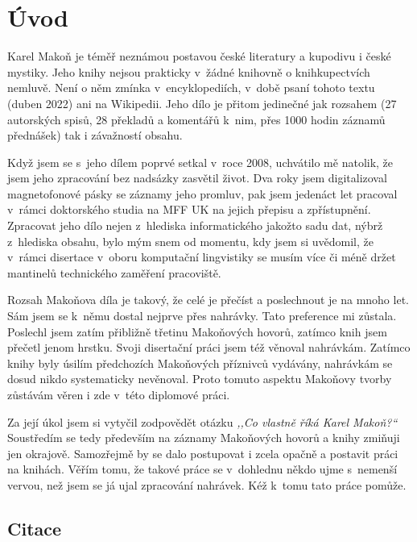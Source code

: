 \chapter{Úvod}
\label{kap:uvod}

Karel Makoň je téměř neznámou postavou české literatury a kupodivu i české
mystiky. Jeho knihy nejsou prakticky v~žádné knihovně o knihkupectvích nemluvě.
Není o něm zmínka v~encyklopediích, v~době psaní tohoto textu (duben 2022) ani
na Wikipedii. Jeho dílo je přitom jedinečné jak rozsahem (27 autorských spisů,
28 překladů a komentářů k~nim, přes 1000 hodin záznamů přednášek) tak i
závažností obsahu.

Když jsem se s~jeho dílem poprvé setkal v~roce 2008, uchvátilo mě natolik, že
jsem jeho zpracování bez nadsázky zasvětil život. Dva roky jsem digitalizoval
magnetofonové pásky se záznamy jeho promluv, pak jsem jedenáct let pracoval
v~rámci doktorského studia na MFF UK na jejich přepisu a zpřístupnění. Zpracovat
jeho dílo nejen z~hlediska informatického jakožto sadu dat, nýbrž z~hlediska
obsahu, bylo mým snem od momentu, kdy jsem si uvědomil, že v~rámci disertace
v~oboru komputační lingvistiky se musím více či méně držet mantinelů technického
zaměření pracoviště.

Rozsah Makoňova díla je takový, že celé je přečíst a poslechnout je na mnoho
let. Sám jsem se k~němu dostal nejprve přes nahrávky. Tato preference mi
zůstala. Poslechl jsem zatím přibližně třetinu Makoňových hovorů, zatímco knih
jsem přečetl jenom hrstku. Svoji disertační práci jsem též věnoval nahrávkám. Zatímco
knihy byly úsilím předchozích Makoňových příznivců vydávány, nahrávkám se
dosud nikdo systematicky nevěnoval. Proto tomuto aspektu Makoňovy tvorby zůstávám věren i
zde v~této diplomové práci.

Za její úkol jsem si vytyčil zodpovědět otázku \textit{,,Co vlastně říká Karel
Makoň?{}``} Soustředím se tedy především na záznamy Makoňových hovorů a knihy
zmiňuji jen okrajově. Samozřejmě by se dalo postupovat i zcela opačně a postavit
práci na knihách. Věřím tomu, že takové práce se v~dohlednu někdo ujme s~nemenší
vervou, než jsem se já ujal zpracování nahrávek. Kéž k~tomu tato práce pomůže.

\section{Citace}

